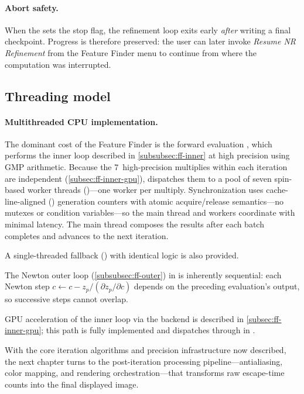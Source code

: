 \paragraph{Abort safety.}
When the  sets the stop flag, the refinement loop
exits early \emph{after} writing a final checkpoint.  Progress is
therefore preserved: the user can later invoke \emph{Resume NR
Refinement} from the Feature Finder menu to continue from where the
computation was interrupted.

\subsection{Threading model}
\label{subsec:ff-threading}

\paragraph{Multithreaded CPU implementation.}
The dominant cost of the Feature Finder is the forward evaluation
, which performs the inner loop
described in \cref{subsubsec:ff-inner} at high precision using GMP
 arithmetic.  Because the 7~high-precision multiplies within
each iteration are independent (\cref{subsec:ff-inner-gpu}),
\FractalShark{} dispatches them to a pool of seven spin-based worker
threads ()---one worker per multiply.
Synchronization uses cache-line-aligned () generation
counters with atomic acquire/release semantics---no mutexes or condition
variables---so the main thread and workers coordinate with minimal latency.
The main thread composes the results after each batch completes and
advances to the next iteration.

A single-threaded fallback () with
identical logic is also provided.

The Newton outer loop (\cref{subsubsec:ff-outer}) in
 is inherently sequential: each Newton step
$c \leftarrow c - z_p / (\partial z_p / \partial c)$ depends on the
preceding evaluation's output, so successive steps cannot overlap.

GPU acceleration of the inner loop via the  backend
is described in \cref{subsec:ff-inner-gpu}; this path is fully
implemented and dispatches through
 in .

With the core iteration algorithms and precision infrastructure now
described, the next chapter turns to the post-iteration processing
pipeline---antialiasing, color mapping, and rendering orchestration---that
transforms raw escape-time counts into the final displayed image.

